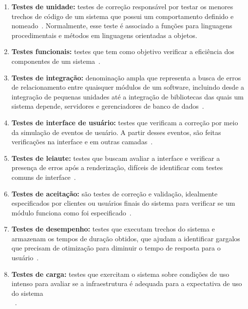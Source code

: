 \begin{enumerate}

\item \textbf{Testes de unidade:} testes de correção responsável por testar os 
menores trechos de código de um sistema que possui um comportamento definido e 
nomeado~\cite{bernardo2011}.
%
Normalmente, esse teste é associado a funções para linguagens procedimentais e métodos em linguagens orientadas a objetos.

\item \textbf{Testes funcionais:} testes que tem como objetivo verificar a eficiência
dos componentes de um sistema~\cite{molinari2003}.

\item \textbf{Testes de integração:} denominação ampla que representa a busca de 
erros de relacionamento entre quaisquer módulos de um software, incluindo desde 
a integração de pequenas unidades até a integração de bibliotecas das quais um 
sistema depende, servidores e gerenciadores de banco de dados~\cite{bernardo2011}.

\item \textbf{Testes de interface de usuário:} testes que verificam a correção 
por meio da simulação de eventos de usuário. A partir desses eventos, são feitas 
verificações na interface e em outras camadas~\cite{bernardo2011}.

\item \textbf{Testes de leiaute:} testes que buscam avaliar a interface 
e verificar a presença de erros após a renderização, difíceis de identificar 
com testes comuns de interface~\cite{bernardo2011}.

\item \textbf{Testes de aceitação:} são testes de correção e validação, idealmente 
especificados por clientes ou usuários finais do sistema para verificar se um 
módulo funciona como foi especificado~\cite{martin2005}.

\item \textbf{Testes de desempenho:} testes que executam trechos do sistema e 
armazenam os tempos de duração obtidos, que ajudam a identificar gargalos que 
precisam de otimização para diminuir o tempo de resposta  para o usuário~\cite{liu2009}.

\item \textbf{Testes de carga:}  testes que exercitam o sistema sobre condições de uso 
intenso para avaliar se a infraestrutura é adequada para a expectativa de uso do 
sistema\\~\cite{avritze1994}.


\end{enumerate}
